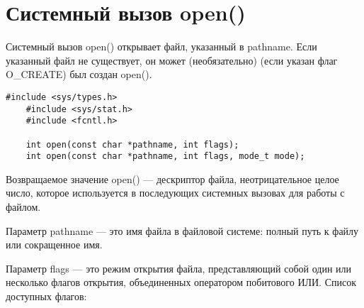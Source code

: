 \chapter{Системный вызов open()}

Системный вызов open() открывает файл, указанный в pathname. Если указанный файл не существует, он может (необязательно) (если указан флаг O\_CREATE) был создан open().

\begin{center}
\captionsetup{justification=raggedright,singlelinecheck=off}
\begin{lstlisting}[label=lst:add,caption=Системный вызов open()]
    #include <sys/types.h>
    #include <sys/stat.h>
    #include <fcntl.h>

    int open(const char *pathname, int flags);
    int open(const char *pathname, int flags, mode_t mode);
\end{lstlisting}
\end{center}

Возвращаемое значение open() --- дескриптор файла, неотрицательное целое число, которое используется в последующих системных вызовах для работы с файлом. 

Параметр pathname --- это имя файла в файловой системе: полный путь к файлу или сокращенное имя.

Параметр flags --- это режим открытия файла, представляющий собой
один или несколько флагов открытия, объединенных оператором побитового ИЛИ. Список доступных флагов:

